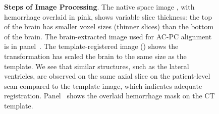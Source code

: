 \documentclass[10pt]{article}\usepackage[]{graphicx}\usepackage[]{color}
\begin{document}
\begin{figure}[H]
{ \label{reg:co1}
}
  \hfill
  \caption{{\bf Steps of Image Processing}.  The native space image \protect{}, with hemorrhage overlaid in pink, shows variable slice thickness: the top of the brain has smaller voxel sizes (thinner slices) than the bottom of the brain.  The brain-extracted image used for AC-PC alignment is in panel~\protect{}. 
The template-registered image (\protect{}) shows the transformation has scaled the brain to the same size as the template.  We see that similar structures, such as the lateral ventricles, are observed on the same axial slice on the patient-level scan compared to the template image, which indicates adequate registration. Panel~\protect{} shows the overlaid hemorrhage mask on the CT template.
  }
  \label{f:reg}
\end{figure}
\end{document}
